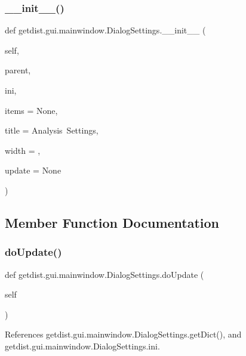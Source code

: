 \subsubsection{\texorpdfstring{\+\_\+\+\_\+init\+\_\+\+\_\+()}{\_\_init\_\_()}}
{\footnotesize\ttfamily def getdist.\+gui.\+mainwindow.\+Dialog\+Settings.\+\_\+\+\_\+init\+\_\+\+\_\+ (\begin{DoxyParamCaption}\item[{}]{self,  }\item[{}]{parent,  }\item[{}]{ini,  }\item[{}]{items = {\ttfamily None},  }\item[{}]{title = {\ttfamily \textquotesingle{}Analysis~Settings\textquotesingle{}},  }\item[{}]{width = {},  }\item[{}]{update = {\ttfamily None} }\end{DoxyParamCaption})}



\subsection{Member Function Documentation}
\mbox{\label{classgetdist_1_1gui_1_1mainwindow_1_1DialogSettings_a92e4be448141585df9a341119d8d8ae6}} 
\subsubsection{\texorpdfstring{do\+Update()}{doUpdate()}}
{\footnotesize\ttfamily def getdist.\+gui.\+mainwindow.\+Dialog\+Settings.\+do\+Update (\begin{DoxyParamCaption}\item[{}]{self }\end{DoxyParamCaption})}



References getdist.\+gui.\+mainwindow.\+Dialog\+Settings.\+get\+Dict(), and getdist.\+gui.\+mainwindow.\+Dialog\+Settings.\+ini.

